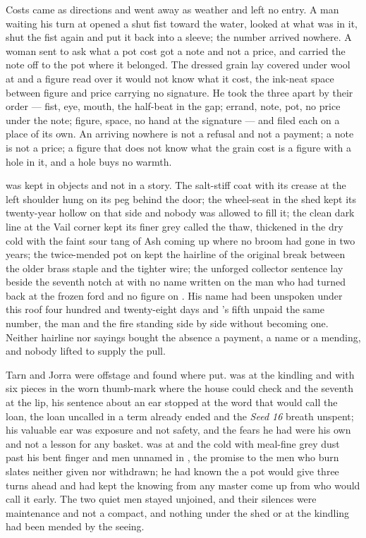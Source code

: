 Costs came as directions and went away as weather and left no entry. A man waiting his turn at  opened a shut fist toward the water, looked at what was in it, shut the fist again and put it back into a sleeve; the number arrived nowhere. A woman sent to ask what a pot cost got a note and not a price, and carried the note off to the pot where it belonged. The dressed grain lay covered under wool at  and a figure read over it would not know what it cost, the ink-neat space between figure and price carrying no signature. He took the three apart by their order --- fist, eye, mouth, the half-beat in the gap; errand, note, pot, no price under the note; figure, space, no hand at the signature --- and filed each on a place of its own. An arriving nowhere is not a refusal and not a payment; a note is not a price; a figure that does not know what the grain cost is a figure with a hole in it, and a hole buys no warmth.

 was kept in objects and not in a story. The salt-stiff coat with its crease at the left shoulder hung on its peg behind the door; the wheel-seat in the shed kept its twenty-year hollow on that side and nobody was allowed to fill it; the clean dark line at the Vail corner kept its finer grey called the thaw, thickened in the dry cold with the faint sour tang of Ash coming up where no broom had gone in two years; the twice-mended pot on  kept the hairline of the original break between the older brass staple and the tighter wire; the unforged collector sentence lay beside the seventh notch at  with no name written on the man who had turned back at the frozen ford and no figure on . His name had been unspoken under this roof four hundred and twenty-eight days and 's fifth unpaid the same number, the man and the fire standing side by side without becoming one. Neither hairline nor sayings bought the absence a payment, a name or a mending, and nobody lifted  to supply the pull.

Tarn and Jorra were offstage and found where put.  was at the kindling and  with six pieces in the worn thumb-mark where the house could check and the seventh at the lip, his sentence about an ear stopped at the word that would call the loan, the loan uncalled in a term already ended and the \emph{Seed 16} breath unspent; his valuable ear was exposure and not safety, and the fears he had were his own and not a lesson for any basket.  was at  and the cold  with meal-fine grey dust past his bent finger and men unnamed in , the promise to the men who burn slates neither given nor withdrawn; he had known the  a pot would give three turns ahead and had kept the knowing from any master come up from  who would call it early. The two quiet men stayed unjoined, and their silences were maintenance and not a compact, and nothing under the shed or at the kindling had been mended by the seeing.

